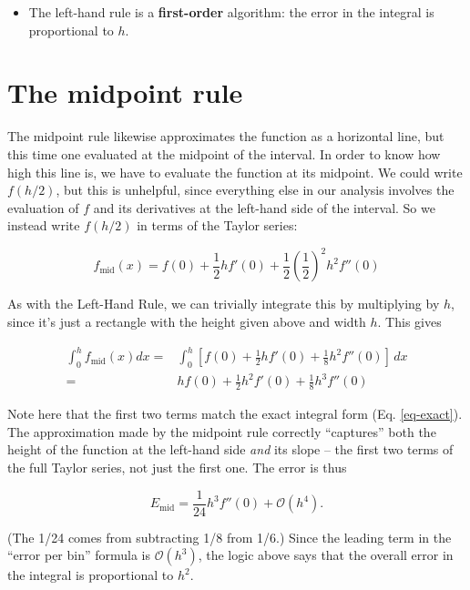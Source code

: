 \documentclass[12ampt]{article}
\begin{document}
\begin{itemize}
  \item{The left-hand rule is a {\bf first-order} algorithm: the error in the integral is proportional to $h$.}
\end{itemize}

\section{The midpoint rule}

The midpoint rule likewise approximates the function as a horizontal line, but this time one evaluated at the midpoint of the interval. In order to know how high this
line is, we have to evaluate the function at its midpoint. We could write $f(h/2)$, but this is unhelpful, since everything else in our analysis involves the evaluation of
$f$ and its derivatives at the left-hand side of the interval. So we instead write $f(h/2)$ in terms of the Taylor series:

\begin{equation}
  f_{\mathrm{mid}}(x) = f(0) + \frac{1}{2}hf'(0) + \frac{1}{2}(\frac{1}{2})^2 h^2f''(0)
\end{equation}

As with the Left-Hand Rule, we can trivially integrate this by multiplying by $h$, since it's just a rectangle with the height given above and width $h$. This gives


\begin{align}
  \int_0^h f_{\mathrm{mid}}(x) dx =& \int_0^h \left[f(0) + \frac{1}{2}hf'(0) + \frac{1}{8} h^2f''(0)\right] \, dx \\
   =& hf(0) + \frac{1}{2}h^2 f'(0) + \frac{1}{8} h^3 f''(0)
\end{align}

Note here that the first two terms match the exact integral form (Eq. \ref{eq-exact}). The approximation made by the midpoint rule correctly ``captures'' both the height of the function at
the left-hand side {\it and} its slope -- the first two terms of the full Taylor series, not just the first one. The error is thus

\begin{equation}
  E_{\mathrm{mid}}=\frac{1}{24} h^3 f''(0) + \mathcal O(h^4).
\end{equation}

(The 1/24 comes from subtracting 1/8 from 1/6.) Since the leading term in the ``error per bin'' formula is $\mathcal O(h^3)$, the logic above says that the overall error in the integral is proportional to $h^2$.
\end{document}
